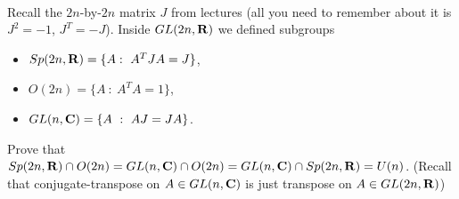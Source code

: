 \documentclass[12pt]{article}
\begin{document}
\iffalse
\begin{answer}
\begin{enumerate}[(a)]
\item On the last sheet we saw that $A^T=-A$ implies $\exp(tA)\in O(n)$ hence $\gamma(t)=\exp(tA)$ is a path with tangent vector $\dot{\gamma}(0)=A$ at the identity for any antisymmetric matrix $A$. Conversely if $\gamma(t)$ is a path in $O(n)$ with $\dot{\gamma}(0)=A$ then from the equation $\gamma(t)^T\gamma(t)=1$ we get $\dot{\gamma}(0)\gamma(0)+\gamma(0)^T\dot{\gamma}(0)=0$ hence $A^T+A=0$.
\item We know that $\det(\exp(tH))=\exp(t\OP{Tr}(H))$ so if $H\in\mathfrak{sl}(n,\RR)$ then $\gamma(t)=\exp(tH)$ is a path in $SL(n,\RR)$ with $\dot{\gamma}(0)=H$. Conversely if $\gamma(t)$ is a path in $SL(n,\RR)$ then $0=\frac{d}{dt}\det(\gamma(t))=\det(\gamma(t))\OP{Tr}(\gamma(t)^{-1}\dot{\gamma}(t))$ by Jacobi's formula and hence $0=\OP{Tr}\dot{\gamma}(0)$.
\item If $F(A)=A^{\dagger}A$ then $F(g+\epsilon B)=(g+\epsilon B)^{\dagger}(g+\epsilon B)=g^{\dagger}g+\epsilon(B^{\dagger}g+g^{\dagger}B)+\epsilon^2B^{\dagger}B$. Thus $d_gF(B)=B^{\dagger}g+g^{\dagger}B=B^{\dagger}g+g^{-1}B$ since $g\in U(n)$.

The map $F$ goes from $\mathfrak{gl}(n,\CC)$ to the space of Hermitian matrices. If we can show that $d_gF$ is surjective for any $g\in U(n)$ then we know that the tangent space at $g$ to $F^{-1}(1)$ is the kernel of $d_gF$, i.e. the matrices $B$ such that $B^{\dagger}g+g^{-1}B=0$. Since $g^{\dagger}=g^{-1}$ this means that $(g^{-1}B)^{\dagger}=B^{\dagger}g=-g^{-1}B$ so $g^{-1}B$ is skew-Hermitian.

In order to check that $d_gF$ is surjective, suppose that $C$ is Hermitian. Let $B=gC/2$. We have $d_gF(B)=B^{\dagger}g+g^{\dagger}B=C^{\dagger}g^{\dagger}g/2+g^{\dagger}gC/2=C/2+C/2=C$ (using $C^{\dagger}=C$ and $g^{\dagger}=g^{-1}$). Therefore $d_gF$ is surjective for any $g\in U(n)$.
\end{enumerate}
\end{answer}
\fi
\newpage


\bigskip

\begin{question}\ \\
Recall the $2n$-by-$2n$ matrix $J$ from lectures (all you need to remember about it is $J^2=-1$, $J^T=-J$). Inside $GL(2n,\mathbf{R})$ we defined subgroups
\begin{itemize}
\item $Sp(2n,\RR)=\{A :\ A^TJA=J\}$,
\item $O(2n)=\{A\ :\ A^TA=1\}$,
\item $GL(n,\CC)=\{A\ :\ AJ=JA\}$.
\end{itemize}
Prove that $Sp(2n,\mathbf{R})\cap O(2n)=GL(n,\mathbf{C})\cap O(2n)=GL(n,\mathbf{C})\cap Sp(2n,\mathbf{R})=U(n)$. (Recall that conjugate-transpose on $A\in GL(n,\mathbf{C})$ is just transpose on $A\in GL(2n,\mathbf{R})$)
\end{question}
\end{document}
